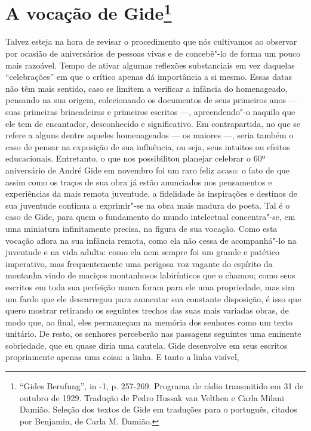 \chapter{A vocação de Gide\footnote[*]{``Gides Berufung'', in -1, p. 257-269. Programa de rádio transmitido em 31 de outubro de 1929. Tradução de Pedro
  Hussak van Velthen e Carla Milani Damião. Seleção dos textos de Gide
  em traduções para o português, citados por Benjamin, de Carla M. Damião.}}

Talvez esteja na hora de revisar o procedimento que nós cultivamos ao
observar por ocasião de aniversários de pessoas vivas e de concebê"-lo de
forma um pouco mais razoável. Tempo de ativar algumas reflexões
substanciais em vez daquelas ``celebrações'' em que o crítico apenas
dá importância a si mesmo. Essas datas não têm mais sentido, caso se limitem a verificar a infância do homenageado, pensando na sua origem, colecionando os documentos de seus primeiros anos --- suas primeiras brincadeiras e primeiros escritos ---, apreendendo"-o naquilo que ele tem de encantador, desconhecido e significativo. Em
contrapartida, no que se refere a alguns dentre aqueles homenageados --- os maiores ---,
seria também o caso de pensar na exposição de sua influência, ou seja, seus intuitos ou
efeitos educacionais. Entretanto, o que nos possibilitou planejar celebrar o 60º aniversário de André Gide em novembro foi um raro feliz acaso: o fato de que assim como os traços de sua
obra já estão anunciados nos pensamentos e experiências da mais remota
juventude, a fidelidade às inspirações e destinos de sua
juventude continua a exprimir"-se na obra mais madura do poeta.
Tal é o caso de Gide, para quem o
fundamento do mundo intelectual concentra"-se,
em uma miniatura infinitamente precisa, na figura de sua vocação. Como esta
vocação aflora na sua infância remota, como ela não cessa de
acompanhá"-lo na juventude e na vida adulta: como ela nem sempre foi um grande e
patético imperativo, mas frequentemente uma perigosa voz vagante do
espírito da montanha vindo de maciços montanhosos
labirínticos que o chamou; como seus escritos em toda sua perfeição nunca foram para
ele uma propriedade, mas sim um fardo que ele descarregou para aumentar
sua constante disposição, é isso que quero mostrar retirando os seguintes trechos das
suas mais variadas obras, de modo que, ao final,
eles permaneçam na memória dos senhores como um texto unitário. De
resto, os senhores perceberão nas passagens seguintes uma eminente
sobriedade, que eu quase diria uma cautela. Gide desenvolve em seus escritos
propriamente apenas uma coisa: a linha. E tanto a linha visível,
